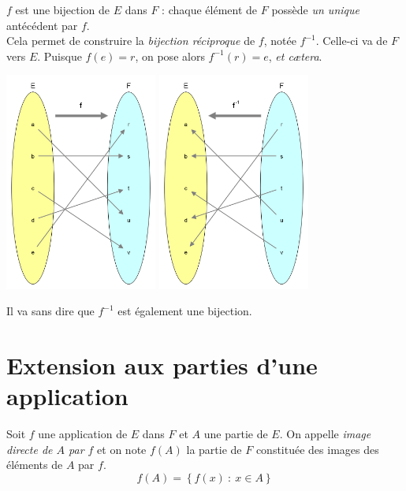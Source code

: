 \begin{exemple}[]
    $f$ est une bijection de $E$ dans $F$ : chaque élément de $F$ possède \textit{un unique} antécédent par $f$.\\
    Cela permet de construire la \textit{bijection réciproque} de $f$, notée $f^{-1}$. Celle-ci va de $F$ vers $E$. Puisque $f(e)=r$, on pose alors $f^{-1}(r)=e$, \textit{et c\ae tera}.\\
    \begin{center}
    \includegraphics[width=5cm]{ensembles/img/bij.png}\hspace{4em}
    \includegraphics[width=5cm]{ensembles/img/bij_rec.png}
    \end{center}
    Il va sans dire que $f^{-1}$ est également une bijection.
\end{exemple}

\section{Extension aux parties d'une application}

\begin{definition}
    Soit $f$ une application de $E$ dans $F$ et $A$ une partie de $E$. On appelle \textit{image directe de $A$ par $f$} et on note $f(A)$ la partie de $F$ constituée des images des éléments de $A$ par $f$.
    $$f(A)=\left\lbrace f(x)\::\:x\in A\right\rbrace$$
\end{definition}

